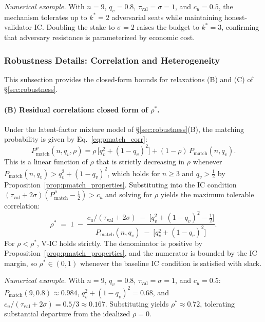 \textit{Numerical example.} With $n = 9$, $q_v = 0.8$, $\tau_{\text{val}} = \sigma = 1$, and $c_u = 0.5$, the mechanism tolerates up to $k^* = 2$ adversarial seats while maintaining honest-validator IC. Doubling the stake to $\sigma = 2$ raises the budget to $k^* = 3$, confirming that adversary resistance is parameterized by economic cost.


\subsubsection{Robustness Details: Correlation and Heterogeneity}
\label{app:robustness_full}

This subsection provides the closed-form bounds for relaxations (B) and (C) of \S\ref{sec:robustness}.

\paragraph{(B) Residual correlation: closed form of $\rho^*$.}
Under the latent-factor mixture model of \S\ref{sec:robustness}(B), the matching probability is given by Eq.~\eqref{eq:pmatch_corr}:
\[
P_{\text{match}}^{\rho}(n, q_v, \rho) = \rho\,\bigl[q_v^2 + (1-q_v)^2\bigr] + (1-\rho)\,P_{\text{match}}(n, q_v).
\]
This is a linear function of $\rho$ that is strictly decreasing in $\rho$ whenever $P_{\text{match}}(n, q_v) > q_v^2 + (1-q_v)^2$, which holds for $n \geq 3$ and $q_v > \tfrac{1}{2}$ by Proposition~\ref{prop:pmatch_properties}. Substituting into the IC condition $(\tau_{\text{val}} + 2\sigma)(P_{\text{match}}^{\rho} - \tfrac{1}{2}) > c_u$ and solving for $\rho$ yields the maximum tolerable correlation:
\begin{equation}
\label{eq:rhostar}
\rho^* \;=\; 1 \;-\; \frac{c_u/(\tau_{\text{val}} + 2\sigma) \;-\; \bigl[q_v^2 + (1-q_v)^2 - \tfrac{1}{2}\bigr]}{P_{\text{match}}(n, q_v) \;-\; \bigl[q_v^2 + (1-q_v)^2\bigr]}.
\end{equation}
For $\rho < \rho^*$, V-IC holds strictly. The denominator is positive by Proposition~\ref{prop:pmatch_properties}, and the numerator is bounded by the IC margin, so $\rho^* \in (0, 1)$ whenever the baseline IC condition is satisfied with slack.

\textit{Numerical example.} With $n = 9$, $q_v = 0.8$, $\tau_{\text{val}} = \sigma = 1$, and $c_u = 0.5$: $P_{\text{match}}(9, 0.8) \approx 0.984$, $q_v^2 + (1-q_v)^2 = 0.68$, and $c_u/(\tau_{\text{val}} + 2\sigma) = 0.5/3 \approx 0.167$. Substituting yields $\rho^* \approx 0.72$, tolerating substantial departure from the idealized $\rho = 0$.

